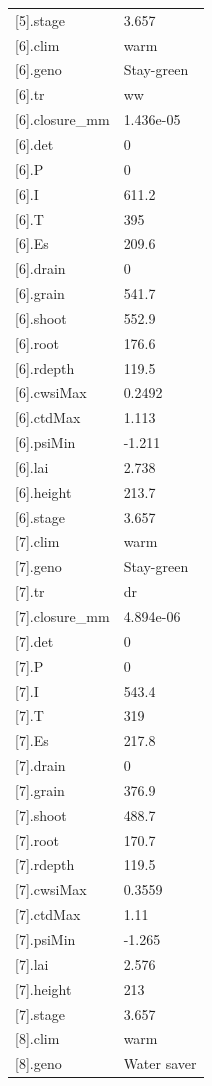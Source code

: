 {\begin{longtable}{p{}p{}}
{}[5].stage & 3.657\\
{}[6].clim & warm\\
{}[6].geno & Stay-green\\
{}[6].tr & ww\\
{}[6].closure\_mm & 1.436e-05\\
{}[6].det & 0\\
{}[6].P & 0\\
{}[6].I & 611.2\\
{}[6].T & 395\\
{}[6].Es & 209.6\\
{}[6].drain & 0\\
{}[6].grain & 541.7\\
{}[6].shoot & 552.9\\
{}[6].root & 176.6\\
{}[6].rdepth & 119.5\\
{}[6].cwsiMax & 0.2492\\
{}[6].ctdMax & 1.113\\
{}[6].psiMin & -1.211\\
{}[6].lai & 2.738\\
{}[6].height & 213.7\\
{}[6].stage & 3.657\\
{}[7].clim & warm\\
{}[7].geno & Stay-green\\
{}[7].tr & dr\\
{}[7].closure\_mm & 4.894e-06\\
{}[7].det & 0\\
{}[7].P & 0\\
{}[7].I & 543.4\\
{}[7].T & 319\\
{}[7].Es & 217.8\\
{}[7].drain & 0\\
{}[7].grain & 376.9\\
{}[7].shoot & 488.7\\
{}[7].root & 170.7\\
{}[7].rdepth & 119.5\\
{}[7].cwsiMax & 0.3559\\
{}[7].ctdMax & 1.11\\
{}[7].psiMin & -1.265\\
{}[7].lai & 2.576\\
{}[7].height & 213\\
{}[7].stage & 3.657\\
{}[8].clim & warm\\
{}[8].geno & Water saver\\

\end{longtable}}
